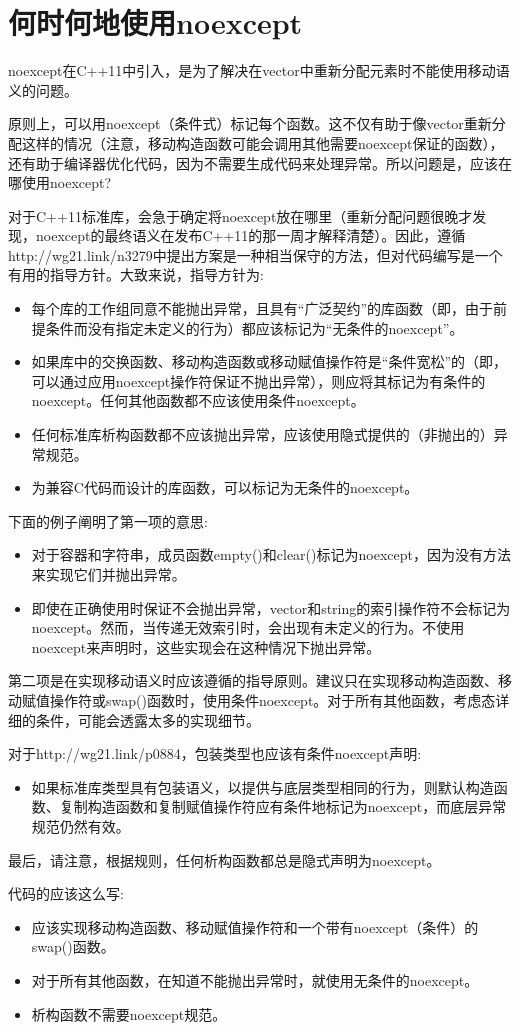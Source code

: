 \section{何时何地使用noexcept}
noexcept在C++11中引入，是为了解决在vector中重新分配元素时不能使用移动语义的问题。

原则上，可以用noexcept（条件式）标记每个函数。这不仅有助于像vector重新分配这样的情况（注意，移动构造函数可能会调用其他需要noexcept保证的函数），还有助于编译器优化代码，因为不需要生成代码来处理异常。所以问题是，应该在哪使用noexcept?

对于C++11标准库，会急于确定将noexcept放在哪里（重新分配问题很晚才发现，noexcept的最终语义在发布C++11的那一周才解释清楚）。因此，遵循http://wg21.link/n3279中提出方案是一种相当保守的方法，但对代码编写是一个有用的指导方针。大致来说，指导方针为:

\begin{itemize}
	\item 每个库的工作组同意不能抛出异常，且具有“广泛契约”的库函数（即，由于前提条件而没有指定未定义的行为）都应该标记为“无条件的noexcept”。
	\item 如果库中的交换函数、移动构造函数或移动赋值操作符是“条件宽松”的（即，可以通过应用noexcept操作符保证不抛出异常），则应将其标记为有条件的noexcept。任何其他函数都不应该使用条件noexcept。
	\item 任何标准库析构函数都不应该抛出异常，应该使用隐式提供的（非抛出的）异常规范。
	\item 为兼容C代码而设计的库函数，可以标记为无条件的noexcept。
\end{itemize}

下面的例子阐明了第一项的意思:

\begin{itemize}
	\item 对于容器和字符串，成员函数empty()和clear()标记为noexcept，因为没有方法来实现它们并抛出异常。
	\item 即使在正确使用时保证不会抛出异常，vector和string的索引操作符不会标记为noexcept。然而，当传递无效索引时，会出现有未定义的行为。不使用noexcept来声明时，这些实现会在这种情况下抛出异常。
\end{itemize}

第二项是在实现移动语义时应该遵循的指导原则。建议只在实现移动构造函数、移动赋值操作符或swap()函数时，使用条件noexcept。对于所有其他函数，考虑态详细的条件，可能会透露太多的实现细节。

对于http://wg21.link/p0884，包装类型也应该有条件noexcept声明:

\begin{itemize}
	\item 如果标准库类型具有包装语义，以提供与底层类型相同的行为，则默认构造函数、复制构造函数和复制赋值操作符应有条件地标记为noexcept，而底层异常规范仍然有效。
\end{itemize}

最后，请注意，根据规则，任何析构函数都总是隐式声明为noexcept。

代码的应该这么写:

\begin{itemize}
	\item 应该实现移动构造函数、移动赋值操作符和一个带有noexcept（条件）的swap()函数。
	\item 对于所有其他函数，在知道不能抛出异常时，就使用无条件的noexcept。
	\item 析构函数不需要noexcept规范。
\end{itemize}







